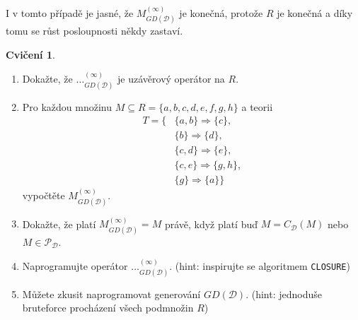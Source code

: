 \documentclass{article}
\theoremstyle {definition}
\newtheorem*{remark}{Poznámka}
\newtheorem{exercise}{Cvičení}
\begin{document}
I v tomto případě je jasné, že $M^{(\infty)}_{GD(\mathcal{D})}$ je
konečná, protože $R$ je konečná a díky tomu se růst posloupnosti někdy
zastaví.

\begin {exercise}
  \begin {enumerate}
  \item Dokažte, že $\dots^{(\infty)}_{GD(\mathcal{D})}$ je uzávěrový
    operátor na $R$.
  \item Pro každou množinu $M\subseteq R= \{a,b,c,d,e,f,g,h\}$ a
    teorii
    \begin {align*}
      T= \{
      &\{a,b\}\Rightarrow \{c\},\\
      &\{b\}\Rightarrow \{d\},\\
      &\{c,d\}\Rightarrow \{e\},\\
      &\{c,e\}\Rightarrow \{g,h\},\\
      &\{g\}\Rightarrow \{a\}\}
    \end {align*}
    vypočtěte $M^{(\infty)}_{GD(\mathcal{D})}$.
  \item Dokažte, že platí $M^{(\infty)}_{GD(\mathcal{D})} = M$ právě, když
    platí buď $M = C_{\mathcal{D}}(M)$ nebo $M\in \mathcal P_{\mathcal D}$.
  \item Naprogramujte operátor $\dots^{(\infty)}_{GD(\mathcal{D})}$.
    (hint: inspirujte se algoritmem \texttt {CLOSURE})
  \item Můžete zkusit naprogramovat generování $GD(\mathcal{D})$.
    (hint: jednoduše bruteforce procházení všech podmnožin $R$) 
  \end {enumerate}
\end {exercise}


  

\end{document}
